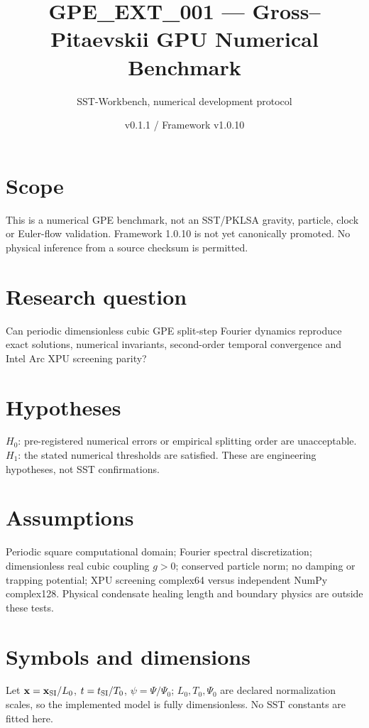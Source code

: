 \documentclass[11pt,a4paper]{article}
\title{GPE\_EXT\_001 --- Gross--Pitaevskii GPU Numerical Benchmark}
\author{SST-Workbench, numerical development protocol}
\date{v0.1.1 / Framework v1.0.10}
\begin{document}
\maketitle
\section{Scope}
This is a numerical GPE benchmark, not an SST/PKLSA gravity, particle, clock or Euler-flow validation. Framework 1.0.10 is not yet canonically promoted. No physical inference from a source checksum is permitted.
\section{Research question}
Can periodic dimensionless cubic GPE split-step Fourier dynamics reproduce exact solutions, numerical invariants, second-order temporal convergence and Intel Arc XPU screening parity?
\section{Hypotheses}
$H_0$: pre-registered numerical errors or empirical splitting order are unacceptable. $H_1$: the stated numerical thresholds are satisfied. These are engineering hypotheses, not SST confirmations.
\section{Assumptions}
Periodic square computational domain; Fourier spectral discretization; dimensionless real cubic coupling $g>0$; conserved particle norm; no damping or trapping potential; XPU screening complex64 versus independent NumPy complex128. Physical condensate healing length and boundary physics are outside these tests.
\section{Symbols and dimensions}
Let $\mathbf{x}=\mathbf{x}_{\rm SI}/L_0$, $t=t_{\rm SI}/T_0$, $\psi=\Psi/\Psi_0$; $L_0,T_0,\Psi_0$ are declared normalization scales, so the implemented model is fully dimensionless. No SST constants are fitted here.
\end{document}

